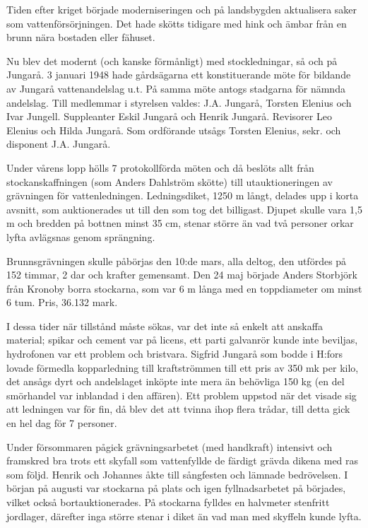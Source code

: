 %

Tiden efter kriget började moderniseringen och på landsbygden aktualisera saker som vattenförsörjningen. Det hade skötts tidigare med hink och ämbar från en brunn nära bostaden eller fähuset.

Nu blev det modernt (och kanske förmånligt) med stockledningar, så och på Jungarå. 3 januari 1948 hade gårdsägarna ett konstituerande möte för bildande av Jungarå vattenandelslag u.t. På samma möte antogs stadgarna för nämnda andelslag. Till medlemmar i styrelsen valdes: J.A. Jungarå, Torsten Elenius och Ivar Jungell. Suppleanter Eskil Jungarå och Henrik Jungarå. Revisorer Leo Elenius och Hilda Jungarå. Som ordförande utsågs Torsten Elenius, sekr. och disponent J.A. Jungarå.




Under vårens lopp hölls 7 protokollförda möten och då beslöts allt 	från stockanskaffningen (som Anders Dahlström skötte) till utauktioneringen av grävningen för vattenledningen. Ledningsdiket, 1250 m långt, delades upp i korta avsnitt, som auktionerades ut till den som tog det billigast. Djupet skulle vara 1,5 m och bredden på bottnen minst 35 cm, stenar större än vad två personer orkar lyfta	avlägsnas genom sprängning.

Brunnsgrävningen skulle påbörjas den 10:de mars, alla deltog, den utfördes på 152 timmar, 2 dar och krafter gemensamt. Den 24 maj började Anders Storbjörk från Kronoby borra stockarna, som var 6 m långa med en toppdiameter om minst 6 tum. Pris, 36.132 mark.

I dessa tider när tillstånd måste sökas, var det inte så enkelt att anskaffa material; spikar och cement var på licens, ett parti galvanrör kunde inte beviljas, hydrofonen var ett problem och bristvara. Sigfrid Jungarå som bodde i H:fors lovade förmedla kopparledning till kraftströmmen till ett pris av 350 mk per kilo, det ansågs dyrt och andelslaget inköpte inte mera än behövliga 150 kg (en del smörhandel var inblandad i den affären). Ett problem uppstod när det visade sig att ledningen var för fin, då 	blev det att tvinna ihop flera trådar, till detta gick en hel dag för 7 personer.

Under försommaren pågick grävningsarbetet (med handkraft) intensivt och framskred bra trots ett skyfall som vattenfyllde de färdigt grävda dikena med ras som följd. Henrik och Johannes åkte till sångfesten och lämnade bedrövelsen. I början på augusti var stockarna på plats och igen fyllnadsarbetet på börjades, vilket 	också bortauktionerades. På stockarna fylldes en halvmeter 	stenfritt jordlager, därefter inga större stenar i diket än vad man med skyffeln kunde lyfta.

